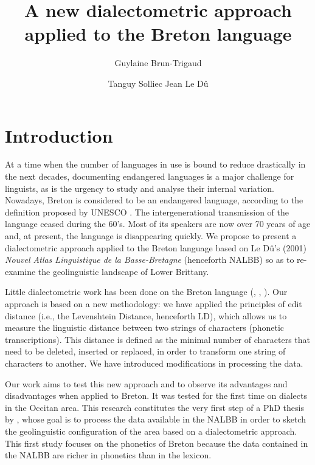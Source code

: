 \documentclass[output=paper]{LSP/langsci}
\author{Guylaine Brun-Trigaud\affiliation{CNRS \& Université de Nice-Sophia-Antipolis, France}\and Tanguy Solliec\affiliation{Université de Paris Descartes, France} \lastand Jean Le Dû\affiliation{Université de Bretagne Occidentale, France}}
\title{A new dialectometric approach applied to the Breton language}
\begin{document}
 
\section{Introduction}

At a time when the number of languages in use is bound to reduce drastically in the next decades, documenting endangered languages is a major challenge for linguists, as is the urgency to study and analyse their internal variation. Nowadays, Breton is considered to be an endangered language, according to the definition proposed by UNESCO \citep{moseley_atlas_2010}. The intergenerational transmission of the language ceased during the 60’s. Most of its speakers are now over 70 years of age and, at present, the language is disappearing quickly. We propose to present a dialectometric approach applied to the Breton language based on Le Dû's (2001) \textit{Nouvel Atlas Linguistique de la Basse-Bretagne} (henceforth NALBB) \citep{le_du_nouvel_2001} so as to re-examine the geolinguistic landscape of Lower Brittany.

Little dialectometric work has been done on the Breton language (\citealt{german_etude_1984}, \citealt{german_methode_1991}, \citealt{costaouec_linguistic_2012}). Our approach is based on a new methodology: we have applied the principles of edit distance (i.e., the Levenshtein Distance, henceforth LD), which allows us to measure the linguistic distance between two strings of characters (phonetic transcriptions). This distance is defined as the minimal number of characters that need to be deleted, inserted or replaced, in order to transform one string of characters to another. We have introduced modifications in processing the data.

Our work aims to test this new approach and to observe its advantages and disadvantages when applied to Breton. It was tested for the first time on dialects in the Occitan area. This research constitutes the very first step of a PhD thesis by \citet{solliec_dialectometrie_2014}, whose goal is to process the data available in the NALBB in order to sketch the geolinguistic configuration of the area based on a dialectometric approach. This first study focuses on the phonetics of Breton because the data contained in the NALBB are richer in phonetics than in the lexicon.
\end{document}
